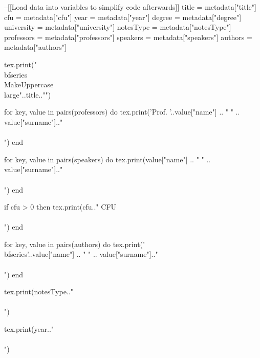 \hypersetup{pageanchor=false}
\ifLuaTeX
\begin{luacode}
--[[Load data into variables to simplify code afterwards]]
title = metadata["title"]
cfu = metadata["cfu"]
year = metadata["year"]
degree = metadata["degree"]
university = metadata["university"]
notesType = metadata["notesType"]
professors = metadata["professors"]
speakers = metadata["speakers"]
authors = metadata["authors"]
\end{luacode}


\begin{titlepage}
\begin{center}
\vspace*{1em}
\begin{luacode}
		tex.print("\\bfseries{\\MakeUppercase{\\large{"..title.."}}}")
\end{luacode}

\vspace{1em}

\begin{luacode}
		for key, value in pairs(professors) do
			 tex.print('Prof. '..value["name"] .. " " .. value["surname"].."\\\\")
		end
\end{luacode}
\begin{luacode}
		for key, value in pairs(speakers) do
			 tex.print(value["name"] .. " " .. value["surname"].."\\\\")
		end
\end{luacode}
\begin{luacode}
	if cfu > 0 then
		tex.print(cfu.." CFU\\\\")
	end
\end{luacode}

\vspace{1em}

\begin{luacode}
		for key, value in pairs(authors) do
			 tex.print('\\bfseries{'..value["name"] .. " " .. value["surname"].."}\\\\")
		end
\end{luacode}

\vfill

\begin{luacode}
		tex.print(notesType.."\\\\")
\end{luacode}
\begin{luacode}
		tex.print(year.."\\\\")
\end{luacode}


\end{center}
\end{titlepage}
